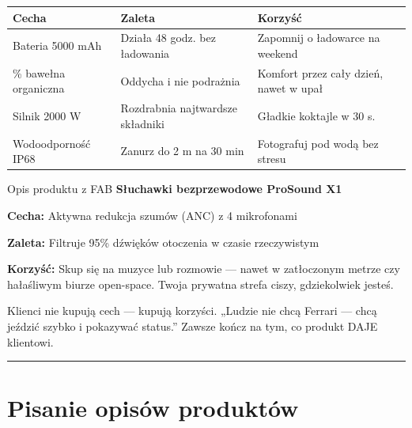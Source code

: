 \documentclass[
  12pt,
  a4paper,
  twoside,
  openright,
  12pt,
  DIV=12,
  BCOR=12mm]{scrbook}
\newcommand{\decoline}{%
  \begin{center}
    \textcolor{bordergray}{\rule{0.3\textwidth}{0.5pt}}
  \end{center}
}
\begin{document}
\begin{longtable}[]{@{}
  >{\raggedright\arraybackslash}p{}
  >{\raggedright\arraybackslash}p{}
  >{\raggedright\arraybackslash}p{}@{}}
\toprule\noalign{}
\begin{minipage}[b]{\linewidth}\raggedright
Cecha
\end{minipage} & \begin{minipage}[b]{\linewidth}\raggedright
Zaleta
\end{minipage} & \begin{minipage}[b]{\linewidth}\raggedright
Korzyść
\end{minipage} \\
\midrule\noalign{}
\endhead
\bottomrule\noalign{}
\endlastfoot
Bateria 5000 mAh & Działa 48 godz. bez ładowania & Zapomnij o ładowarce
na weekend \\
100\% bawełna organiczna & Oddycha i nie podrażnia & Komfort przez cały
dzień, nawet w upał \\
Silnik 2000 W & Rozdrabnia najtwardsze składniki & Gładkie koktajle w 30
s. \\
Wodoodporność IP68 & Zanurz do 2 m na 30 min & Fotografuj pod wodą bez
stresu \\
\end{longtable}

\begin{przyklad}{Opis produktu z FAB}
\textbf{Słuchawki bezprzewodowe ProSound X1}

\textbf{Cecha:} Aktywna redukcja szumów (ANC) z 4 mikrofonami

\textbf{Zaleta:} Filtruje 95\% dźwięków otoczenia w czasie rzeczywistym

\textbf{Korzyść:} Skup się na muzyce lub rozmowie --- nawet w zatłoczonym metrze czy hałaśliwym biurze open-space. Twoja prywatna strefa ciszy, gdziekolwiek jesteś.
\end{przyklad}

\begin{wskazowka}
Klienci nie kupują cech --- kupują korzyści. „Ludzie nie chcą Ferrari --- chcą jeździć szybko i pokazywać status.” Zawsze kończ na tym, co produkt DAJE klientowi.
\end{wskazowka}

\decoline

\section{Pisanie opisów produktów}\label{pisanie-opisuxf3w-produktuxf3w}
\end{document}
